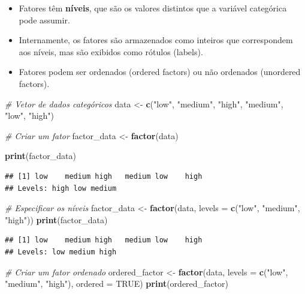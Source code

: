 \documentclass[
]{book}
\newenvironment{Shaded}{\begin{snugshade}}{\end{snugshade}}
\newcommand{\AttributeTok}[1]{\textcolor[rgb]{0.13,0.29,0.53}{#1}}
\newcommand{\CommentTok}[1]{\textcolor[rgb]{0.56,0.35,0.01}{\textit{#1}}}
\newcommand{\ConstantTok}[1]{\textcolor[rgb]{0.56,0.35,0.01}{#1}}
\newcommand{\FunctionTok}[1]{\textcolor[rgb]{0.13,0.29,0.53}{\textbf{#1}}}
\newcommand{\NormalTok}[1]{#1}
\newcommand{\OtherTok}[1]{\textcolor[rgb]{0.56,0.35,0.01}{#1}}
\newcommand{\StringTok}[1]{\textcolor[rgb]{0.31,0.60,0.02}{#1}}
\theoremstyle{definition}
\theoremstyle{definition}
\theoremstyle{definition}
\theoremstyle{definition}
\theoremstyle{remark}
\begin{document}
\begin{itemize}
\item
  Fatores têm \textbf{níveis}, que são os valores distintos que a variável categórica pode assumir.
\item
  Internamente, os fatores são armazenados como inteiros que correspondem aos níveis, mas são exibidos como rótulos (labels).
\item
  Fatores podem ser ordenados (ordered factors) ou não ordenados (unordered factors).
\end{itemize}

\begin{Shaded}
\begin{Highlighting}[]
\CommentTok{\# Vetor de dados categóricos}
\NormalTok{data }\OtherTok{\textless{}{-}} \FunctionTok{c}\NormalTok{(}\StringTok{"low"}\NormalTok{, }\StringTok{"medium"}\NormalTok{, }\StringTok{"high"}\NormalTok{, }\StringTok{"medium"}\NormalTok{, }\StringTok{"low"}\NormalTok{, }\StringTok{"high"}\NormalTok{)}

\CommentTok{\# Criar um fator}
\NormalTok{factor\_data }\OtherTok{\textless{}{-}} \FunctionTok{factor}\NormalTok{(data)}

\FunctionTok{print}\NormalTok{(factor\_data)}
\end{Highlighting}
\end{Shaded}

\begin{verbatim}
## [1] low    medium high   medium low    high  
## Levels: high low medium
\end{verbatim}

\begin{Shaded}
\begin{Highlighting}[]
\CommentTok{\# Especificar os níveis}
\NormalTok{factor\_data }\OtherTok{\textless{}{-}} \FunctionTok{factor}\NormalTok{(data, }\AttributeTok{levels =} \FunctionTok{c}\NormalTok{(}\StringTok{"low"}\NormalTok{, }\StringTok{"medium"}\NormalTok{, }\StringTok{"high"}\NormalTok{))}
\FunctionTok{print}\NormalTok{(factor\_data)}
\end{Highlighting}
\end{Shaded}

\begin{verbatim}
## [1] low    medium high   medium low    high  
## Levels: low medium high
\end{verbatim}

\begin{Shaded}
\begin{Highlighting}[]
\CommentTok{\# Criar um fator ordenado}
\NormalTok{ordered\_factor }\OtherTok{\textless{}{-}} \FunctionTok{factor}\NormalTok{(data, }\AttributeTok{levels =} \FunctionTok{c}\NormalTok{(}\StringTok{"low"}\NormalTok{, }\StringTok{"medium"}\NormalTok{, }\StringTok{"high"}\NormalTok{), }\AttributeTok{ordered =} \ConstantTok{TRUE}\NormalTok{)}
\FunctionTok{print}\NormalTok{(ordered\_factor)}
\end{Highlighting}
\end{Shaded}
\end{document}
